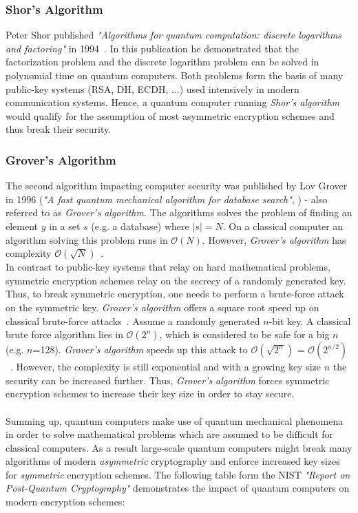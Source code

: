 \subsubsection{Shor's Algorithm}
Peter Shor published \textit{"Algorithms for quantum computation: discrete logarithms and factoring"} in 1994~\parencite{shor1994algorithms}. In this publication he demonstrated that the factorization problem and the discrete logarithm problem can be solved in polynomial time on quantum computers. Both problems form the basis of many public-key systems (\gls{RSA}, \gls{DH}, \gls{ECDH}, ...) used intensively in modern communication systems. Hence, a quantum computer running \textit{Shor's algorithm} would qualify for the assumption of most asymmetric encryption schemes and thus break their security.


\subsubsection{Grover's Algorithm}
The second algorithm impacting computer security was published by Lov Grover in 1996 (\textit{"A fast quantum mechanical algorithm for database search"}, \parencite{grover1996fast}) - also referred to as \textit{Grover's algorithm}. The algorithms solves the problem of finding an element $y$ in a set $s$ (e.g. a database) where $|s| = N$. On a classical computer an algorithm solving this problem runs in $\mathcal{O}(N)$. However, \textit{Grover's algorithm} has complexity $\mathcal{O}(\sqrt{N})$~\parencite{nielsen2002quantum}.\\
In contrast to public-key systems that relay on hard mathematical problems, symmetric encryption schemes relay on the secrecy of a randomly generated key. 
Thus, to break symmetric encryption, one needs to perform a brute-force attack on the symmetric key. \textit{Grover's algorithm} offers a square root speed up on classical brute-force attacks~\parencite{mavroeidis2018impact}. Assume a randomly generated $n$-bit key. A classical brute force algorithm lies in $\mathcal{O}(2^n)$, which is considered to be safe for a big $n$ (e.g. $n$=128). \textit{Grover's algorithm} speeds up this attack to $\mathcal{O}(\sqrt{2^n})$ = $\mathcal{O}(2^{n/2})$~\parencite{mavroeidis2018impact}. However, the complexity is still exponential and with a growing key size $n$ the security can be increased further. Thus, \textit{Grover's algorithm} forces symmetric encryption schemes to increase their key size in order to stay secure.
\\\\
Summing up, quantum computers make use of quantum mechanical phenomena in order to solve mathematical problems which are assumed to be difficult for classical computers. As a result large-scale quantum computers might break many algorithms of modern \textit{asymmetric} cryptography and enforce increased key sizes for \textit{symmetric} encryption schemes. The following table form the NIST \textit{"Report on Post-Quantum Cryptography"} \parencite{chen2016report} demonstrates the impact of quantum computers on modern encryption schemes:

